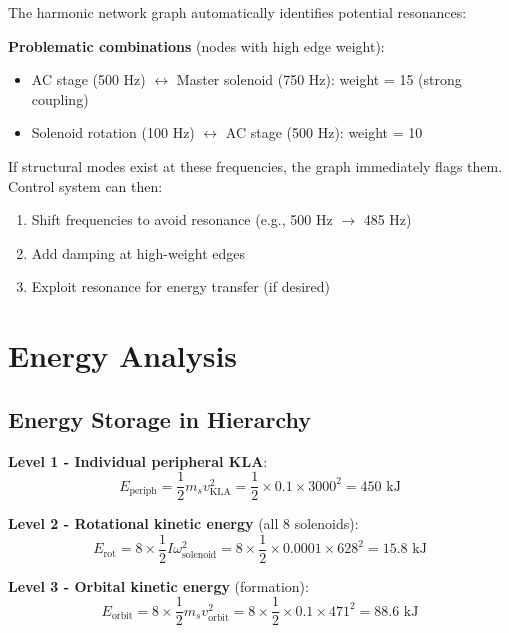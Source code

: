\documentclass[12pt,a4paper]{article}
\begin{document}
The harmonic network graph automatically identifies potential resonances:

\textbf{Problematic combinations} (nodes with high edge weight):
\begin{itemize}
\item AC stage (500 Hz) $\leftrightarrow$ Master solenoid (750 Hz): weight = 15 (strong coupling)
\item Solenoid rotation (100 Hz) $\leftrightarrow$ AC stage (500 Hz): weight = 10
\end{itemize}

If structural modes exist at these frequencies, the graph immediately flags them. Control system can then:
\begin{enumerate}
\item Shift frequencies to avoid resonance (e.g., 500 Hz $\to$ 485 Hz)
\item Add damping at high-weight edges
\item Exploit resonance for energy transfer (if desired)
\end{enumerate}

\section{Energy Analysis}

\subsection{Energy Storage in Hierarchy}

\textbf{Level 1 - Individual peripheral KLA}:
\begin{equation}
E_{\text{periph}} = \frac{1}{2} m_s v_{\text{KLA}}^2 = \frac{1}{2} \times 0.1 \times 3000^2 = 450 \text{ kJ}
\end{equation}

\textbf{Level 2 - Rotational kinetic energy} (all 8 solenoids):
\begin{equation}
E_{\text{rot}} = 8 \times \frac{1}{2} I \omega_{\text{solenoid}}^2 = 8 \times \frac{1}{2} \times 0.0001 \times 628^2 = 15.8 \text{ kJ}
\end{equation}

\textbf{Level 3 - Orbital kinetic energy} (formation):
\begin{equation}
E_{\text{orbit}} = 8 \times \frac{1}{2} m_s v_{\text{orbit}}^2 = 8 \times \frac{1}{2} \times 0.1 \times 471^2 = 88.6 \text{ kJ}
\end{equation}
\end{document}

